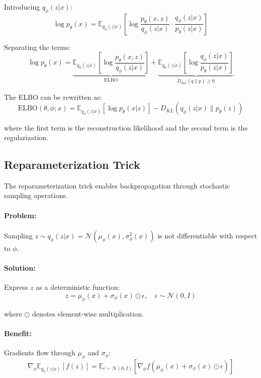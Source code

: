 \documentclass[conference]{IEEEtran}
\begin{document}
Introducing $q_\phi(z|x)$:
\begin{equation}
\log p_\theta(x) = \mathbb{E}_{q_\phi(z|x)} \left[ \log \frac{p_\theta(x, z)}{q_\phi(z|x)} \cdot \frac{q_\phi(z|x)}{p_\theta(z|x)} \right]
\end{equation}

Separating the terms:
\begin{equation}
\log p_\theta(x) = \underbrace{\mathbb{E}_{q_\phi(z|x)} \left[ \log \frac{p_\theta(x, z)}{q_\phi(z|x)} \right]}_{\text{ELBO}} + \underbrace{\mathbb{E}_{q_\phi(z|x)} \left[ \log \frac{q_\phi(z|x)}{p_\theta(z|x)} \right]}_{D_{KL}(q \| p) \geq 0}
\end{equation}

The ELBO can be rewritten as:
\begin{equation}
\text{ELBO}(\theta, \phi; x) = \mathbb{E}_{q_\phi(z|x)} \left[ \log p_\theta(x|z) \right] - D_{KL}(q_\phi(z|x) \| p_\theta(z))
\end{equation}

where the first term is the reconstruction likelihood and the second term is the regularization.

\subsection{Reparameterization Trick}

The reparameterization trick enables backpropagation through stochastic sampling operations.

\paragraph{Problem:} Sampling $z \sim q_\phi(z|x) = \mathcal{N}(\mu_\phi(x), \sigma_\phi^2(x))$ is not differentiable with respect to $\phi$.

\paragraph{Solution:} Express $z$ as a deterministic function:
\begin{equation}
z = \mu_\phi(x) + \sigma_\phi(x) \odot \epsilon, \quad \epsilon \sim \mathcal{N}(0, I)
\end{equation}

where $\odot$ denotes element-wise multiplication.

\paragraph{Benefit:} Gradients flow through $\mu_\phi$ and $\sigma_\phi$:
\begin{equation}
\nabla_\phi \mathbb{E}_{q_\phi(z|x)}[f(z)] = \mathbb{E}_{\epsilon \sim \mathcal{N}(0,I)}[\nabla_\phi f(\mu_\phi(x) + \sigma_\phi(x) \odot \epsilon)]
\end{equation}
\end{document}
